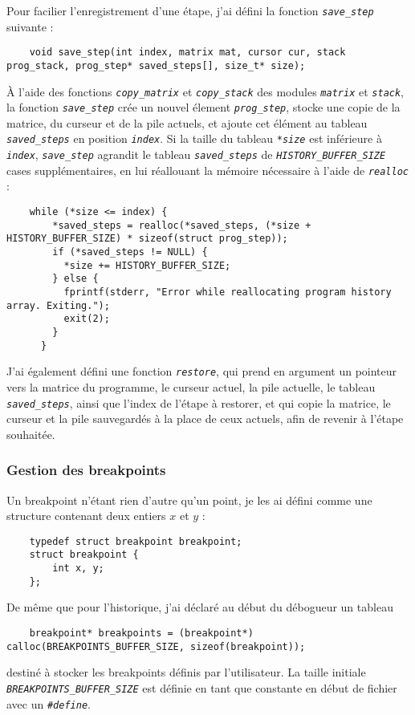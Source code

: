 \documentclass[a4paper,11pt]{article}
\newcommand{\code}[1]{{\itshape\lstinline{#1}}}
\begin{document}
\bigskip

Pour facilier l'enregistrement d'une étape, j'ai défini la fonction \code{save_step} suivante :
{\small\begin{lstlisting}
    void save_step(int index, matrix mat, cursor cur, stack prog_stack, prog_step* saved_steps[], size_t* size);
\end{lstlisting}}
À l'aide des fonctions \code{copy_matrix} et \code{copy_stack} des modules \code{matrix} et \code{stack}, la fonction \code{save_step} crée un nouvel élement \code{prog_step}, stocke une copie de la matrice, du curseur et de la pile actuels, et ajoute cet élément au tableau \code{saved_steps} en position \code{index}. Si la taille du tableau \code{*size} est inférieure à \code{index}, \code{save_step} agrandit le tableau \code{saved_steps} de \code{HISTORY_BUFFER_SIZE} cases supplémentaires, en lui réallouant la mémoire nécessaire à l'aide de \code{realloc} :

{\small\begin{lstlisting}
    while (*size <= index) {
        *saved_steps = realloc(*saved_steps, (*size + HISTORY_BUFFER_SIZE) * sizeof(struct prog_step));
        if (*saved_steps != NULL) {
          *size += HISTORY_BUFFER_SIZE;
        } else {
          fprintf(stderr, "Error while reallocating program history array. Exiting.");
          exit(2);
        }
      }
\end{lstlisting}}

J'ai également défini une fonction \code{restore}, qui prend en argument un pointeur vers la matrice du programme, le curseur actuel, la pile actuelle, le tableau \code{saved_steps}, ainsi que l'index de l'étape à restorer, et qui copie la matrice, le curseur et la pile sauvegardés à la place de ceux actuels, afin de revenir à l'étape souhaitée.

\subsubsection*{Gestion des breakpoints}
Un breakpoint n'étant rien d'autre qu'un point, je les ai défini comme une structure contenant deux entiers $x$ et $y$ :
{\small\begin{lstlisting}
    typedef struct breakpoint breakpoint;
    struct breakpoint {
        int x, y;
    };
\end{lstlisting}}

De même que pour l'historique, j'ai déclaré au début du débogueur un tableau
{\small\begin{lstlisting}
    breakpoint* breakpoints = (breakpoint*) calloc(BREAKPOINTS_BUFFER_SIZE, sizeof(breakpoint));
\end{lstlisting}}
destiné à stocker les breakpoints définis par l'utilisateur. La taille initiale \code{BREAKPOINTS_BUFFER_SIZE} est définie en tant que constante en début de fichier avec un \code{#define}.
\end{document}
